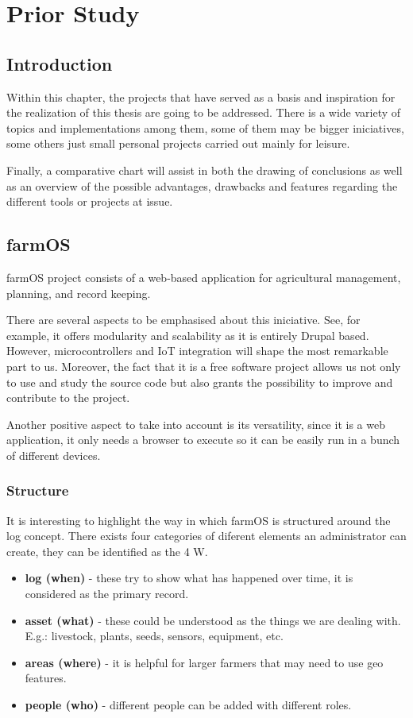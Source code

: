 \chapter{Prior Study}\label{cap:planificación}

\section{Introduction}
Within this chapter, the projects that have served as a basis and inspiration for the realization of this thesis are going to be addressed. There is a wide variety of topics and implementations among them, some of them may be bigger iniciatives, some others just small personal projects carried out mainly for leisure.

Finally, a comparative chart will assist in both the drawing of conclusions as well as an overview of the possible advantages, drawbacks and features regarding the different tools or projects at issue.

\section{farmOS}
farmOS\cite{farmosrepo} project consists of a web-based application for agricultural management, planning, and record keeping.

There are several aspects to be emphasised about this iniciative. See, for example, it offers modularity and scalability as it is entirely Drupal based. However, microcontrollers and IoT integration will shape the most remarkable part to us. Moreover, the fact that it is a free software project allows us not only to use and study the source code but also grants the possibility to improve and contribute to the project.

Another positive aspect to take into account is its versatility, since it is a web application, it only needs a browser to execute so it can be easily run in a bunch of different devices.

\subsection{Structure}
It is interesting to highlight the way in which farmOS is structured\cite{farmosguide} around the log concept. There exists four categories of diferent elements an administrator can create, they can be identified as the 4 W.
\begin{itemize}
	\item \textbf{log (when)} - these try to show what has happened over time, it is considered as the primary record.
	\item \textbf{asset (what)} - these could be understood as the things we are dealing with. E.g.: livestock, plants, seeds, sensors, equipment, etc.
	\item \textbf{areas (where)} - it is helpful for larger farmers that may need to use geo features.
	\item \textbf{people (who)} - different people can be added with different roles.
\end{itemize}


